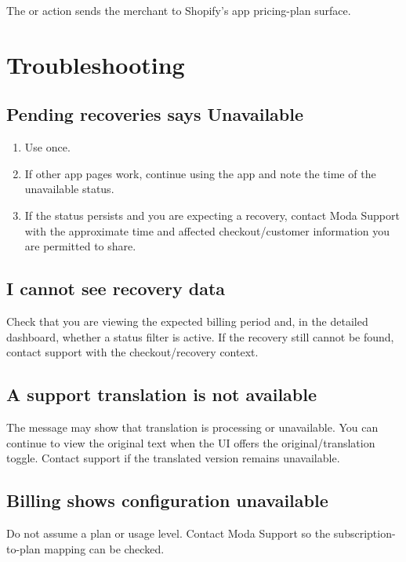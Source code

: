 The  or  action sends the merchant to Shopify's app pricing-plan surface.


\chapter{Troubleshooting}

\section{Pending recoveries says Unavailable}
\begin{enumerate}
  \item Use  once.
  \item If other app pages work, continue using the app and note the time of the unavailable status.
  \item If the status persists and you are expecting a recovery, contact Moda Support with the approximate time and affected checkout/customer information you are permitted to share.
\end{enumerate}

\section{I cannot see recovery data}
Check that you are viewing the expected billing period and, in the detailed dashboard, whether a status filter is active. If the recovery still cannot be found, contact support with the checkout/recovery context.

\section{A support translation is not available}
The message may show that translation is processing or unavailable. You can continue to view the original text when the UI offers the original/translation toggle. Contact support if the translated version remains unavailable.

\section{Billing shows configuration unavailable}
Do not assume a plan or usage level. Contact Moda Support so the subscription-to-plan mapping can be checked.

